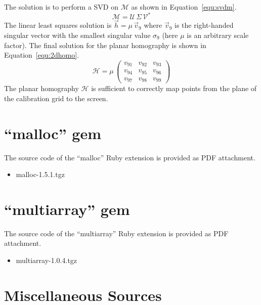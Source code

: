\documentclass[12pt,a4paper,oneside,openright]{book}
\newcommand{\equ}[1]{Equation~\ref{equ:#1}}
\begin{document}
\begin{CJK}{UTF8}{}
The solution is to perform a \ac{SVD} on $\mathcal{M}$ as shown in \equ{svdm}.
\begin{equation}\label{equ:svdm}
  \mathcal{M}=\mathcal{U}\,\Sigma\,\mathcal{V}^*
\end{equation}
The linear least squares solution is $\vec{h}=\mu\,\vec{v}_9$ where $\vec{v}_9$ is the right-handed singular vector with the smallest singular value $\sigma_9$ (here $\mu$ is an arbitrary scale factor). The final solution for the planar homography is shown in \equ{2dhomo}.
\begin{equation}\label{equ:2dhomo}
  \mathcal{H}=\mu\,\begin{pmatrix}v_{91}&v_{92}&v_{93}\\v_{94}&v_{95}&v_{96}\\v_{97}&v_{98}&v_{99}\end{pmatrix}
\end{equation}
The planar homography $\mathcal{H}$ is sufficient to correctly map points from the plane of the calibration grid to the screen.

\section{``malloc'' gem}
The source code of the ``malloc'' Ruby extension is provided as PDF attachment.
\begin{itemize}
\item malloc-1.5.1.tgz 
\end{itemize}

\section{``multiarray'' gem}
The source code of the ``multiarray'' Ruby extension is provided as PDF attachment.
\begin{itemize}
\item multiarray-1.0.4.tgz 
\end{itemize}

\section{Miscellaneous Sources}

\end{CJK}
\end{document}
